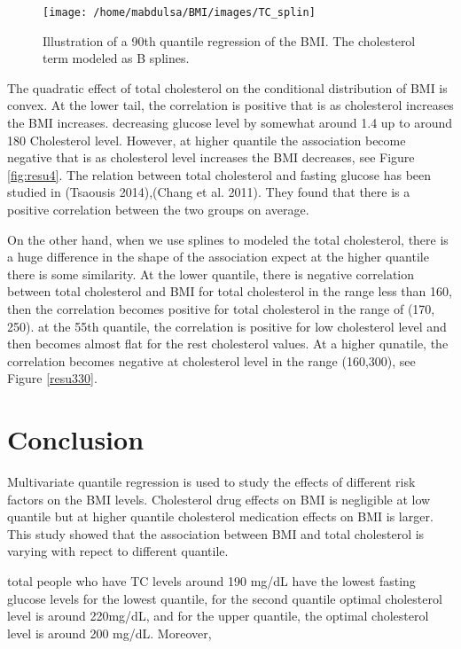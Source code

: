 \documentclass[
  12pt,
]{article}
\begin{document}
\begin{figure}

{\centering \texttt{[image: /home/mabdulsa/BMI/images/TC\_splin]} 

}

\caption{ Illustration of a 90th quantile regression of the BMI. The cholesterol term modeled  as B splines. }\label{fig:resu330}
\end{figure}

The quadratic effect of total cholesterol on the conditional distribution of BMI is convex. At the lower tail, the correlation is positive that is as cholesterol increases the BMI increases. decreasing glucose level by somewhat around 1.4 up to around 180 Cholesterol level. However, at higher quantile the association become negative that is as cholesterol level increases the BMI decreases, see Figure \ref{fig:resu4}. The relation between total cholesterol and fasting glucose has been studied in (Tsaousis 2014),(Chang et al. 2011). They found that there is a positive correlation between the two groups on average.

On the other hand, when we use splines to modeled the total cholesterol, there is a huge difference in the shape of the association expect at the higher quantile there is some similarity. At the lower quantile, there is negative correlation between total cholesterol and BMI for total cholesterol in the range less than 160, then the correlation becomes positive for total cholesterol in the range of (170, 250). at the 55th quantile, the correlation is positive for low cholesterol level and then becomes almost flat for the rest cholesterol values. At a higher qunatile, the correlation becomes negative at cholesterol level in the range (160,300), see Figure \ref{resu330}.

\section{Conclusion}

Multivariate quantile regression is used to study the effects of different risk factors on the BMI levels. Cholesterol drug effects on BMI is negligible at low quantile but at higher quantile cholesterol medication effects on BMI is larger. This study showed that the association between BMI and total cholesterol is varying with repect to different quantile.

total people who have TC levels around 190 mg/dL have the lowest fasting glucose levels for the lowest quantile, for the second quantile optimal cholesterol level is around 220mg/dL, and for the upper quantile, the optimal cholesterol level is around 200 mg/dL. Moreover,
\end{document}
